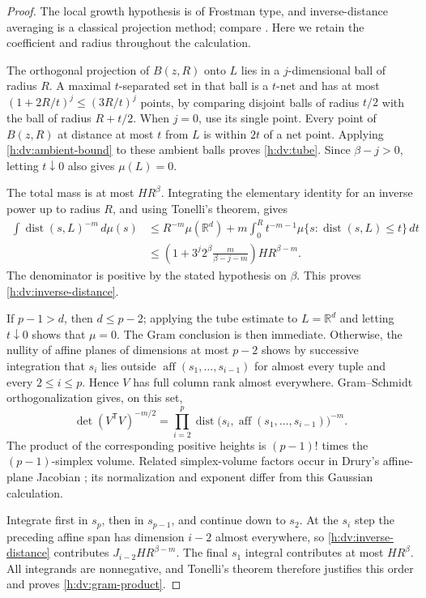 \begin{proof}
The local growth hypothesis is of Frostman type, and
inverse-distance averaging is a classical projection method; compare
\cite[Lemmas~3.5 and~5.1, pp.~230--231 and~236]{Mattila1975}.
Here we retain the coefficient and radius throughout the calculation.

The orthogonal projection of \(B(z,R)\) onto \(L\) lies in a
\(j\)-dimensional ball of radius \(R\).  A maximal \(t\)-separated set
in that ball is a \(t\)-net and has at most
\((1+2R/t)^j\le(3R/t)^j\) points, by comparing disjoint balls of radius
\(t/2\) with the ball of radius \(R+t/2\).  When \(j=0\), use its
single point.  Every point of \(B(z,R)\) at distance at most \(t\) from
\(L\) is within \(2t\) of a net point.  Applying
\eqref{h:dv:ambient-bound} to these ambient balls proves
\eqref{h:dv:tube}.  Since \(\beta-j>0\), letting \(t\downarrow0\)
also gives \(\mu(L)=0\).

The total mass is at most \(HR^\beta\).  Integrating the elementary
identity for an inverse power up to radius \(R\), and using Tonelli's
theorem, gives
\begin{align*}
 \int\operatorname{dist}(s,L)^{-m}\,d\mu(s)
 &\le R^{-m}\mu(\mathbb R^d)
   +m\int_0^R t^{-m-1}
       \mu\{s:\operatorname{dist}(s,L)\le t\}\,dt\\
 &\le
 \left(1+3^j2^\beta\frac{m}{\beta-j-m}\right)
 HR^{\beta-m}.
\end{align*}
The denominator is positive by the stated hypothesis on \(\beta\).
This proves \eqref{h:dv:inverse-distance}.

If \(p-1>d\), then \(d\le p-2\); applying the tube estimate to
\(L=\mathbb R^d\) and letting \(t\downarrow0\) shows that \(\mu=0\).
The Gram conclusion is then immediate.  Otherwise, the nullity of
affine planes of dimensions at most \(p-2\) shows by successive
integration that \(s_i\) lies outside
\(\operatorname{aff}(s_1,\ldots,s_{i-1})\) for almost every tuple and
every \(2\le i\le p\).  Hence \(V\) has full column rank almost
everywhere.  Gram--Schmidt orthogonalization gives, on this set,
\[
 \det(V^{\mathsf T}V)^{-m/2}
 =
 \prod_{i=2}^p
 \operatorname{dist}\bigl(s_i,
       \operatorname{aff}(s_1,\ldots,s_{i-1})\bigr)^{-m}.
\]
The product of the corresponding positive heights is
\((p-1)!\) times the \((p-1)\)-simplex volume. Related
simplex-volume factors occur in Drury's affine-plane Jacobian
\cite[Lemma~1, pp.~497--498]{Drury1984}; its normalization and
exponent differ from this Gaussian calculation.

Integrate first in \(s_p\), then in \(s_{p-1}\), and continue down to
\(s_2\).  At the \(s_i\) step the preceding affine span has dimension
\(i-2\) almost everywhere, so \eqref{h:dv:inverse-distance} contributes
\(J_{i-2}HR^{\beta-m}\).  The final \(s_1\) integral contributes at
most \(HR^\beta\).  All integrands are nonnegative, and Tonelli's
theorem therefore justifies this order and proves
\eqref{h:dv:gram-product}.

\end{proof}

